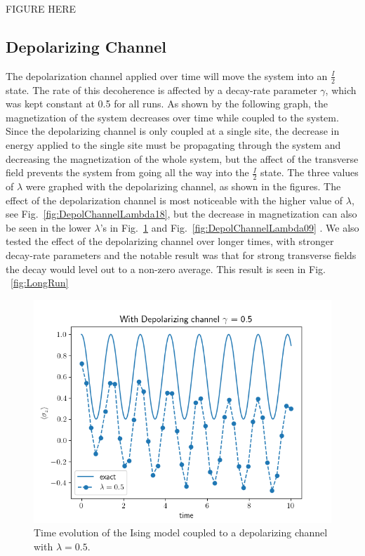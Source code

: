 \documentclass[12pt, twocolumn]{article}
\begin{document}
  FIGURE HERE

  \subsection{Depolarizing Channel}
  The depolarization channel applied over time will move the system into an \( \frac{I}{2} \) state. The rate of this decoherence is affected by a decay-rate parameter \( \gamma \), which was kept constant at 0.5 for all runs. As shown by the following graph, the magnetization of the system decreases over time while coupled to the system. Since the depolarizing channel is only coupled at a single site, the decrease in energy applied to the single site must be propagating through the system and decreasing the magnetization of the whole system, but the affect of the transverse field prevents the system from going all the way into the \( \frac{I}{2} \) state. The three values of \( \lambda \) were graphed with the depolarizing channel, as shown in the figures. The effect of the depolarization channel is most noticeable with the higher value of \( \lambda \), see Fig.~\ref{fig:DepolChannelLambda18},  but the decrease in magnetization can also be seen in the lower \( \lambda \)'s in Fig.~\ref{fig:DepolChannelLambda05} and Fig.~\ref{fig:DepolChannelLambda09} . We also tested the effect of the depolarizing channel over longer times, with stronger decay-rate parameters and the notable result was that for strong transverse fields the decay would level out to a non-zero average. This result is seen in Fig. ~\ref{fig:LongRun}

  \begin{figure}%

    \includegraphics[width=\columnwidth, inner]{images/DepolChannelLambda05.png}
    \caption{Time evolution of the Ising model coupled to a depolarizing channel with \( \lambda = 0.5 \).%
      \label{fig:DepolChannelLambda05}}
  \end{figure}
\end{document}
